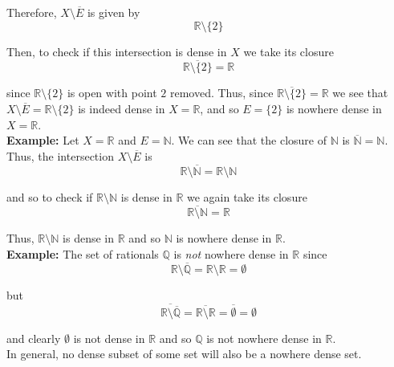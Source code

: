 \documentclass[12pt]{article}
\newcommand{\R}{\mathbb R}
\newcommand{\N}{\mathbb N}
\newcommand{\Q}{\mathbb Q}
\begin{document}
Therefore, $X\setminus\overline{E}$ is given by
\begin{equation*}
	\R\setminus\{2\}
\end{equation*}

Then, to check if this intersection is dense in $X$ we take its closure
\begin{equation*}
	\overline{\R\setminus\{2\}} = \R
\end{equation*}

since $\R\setminus\{2\}$ is open with point $2$ removed. Thus, since $\overline{\R\setminus\{2\}} = \R$ we see that $X \setminus \overline{E} = \R\setminus\{2\}$ is indeed dense in $X = \R$, and so $E = \{2\}$ is nowhere dense in $X = \R$. \\

%
%
{\bf Example:} Let $X = \R$ and $E = \N$. We can see that the closure of $\N$ is $\overline{\N} = \N$. Thus, the intersection $X \setminus \overline{E}$ is
\begin{equation*}
	\R\setminus{\overline{\N}} = \R\setminus\N 
\end{equation*}

and so to check if $\R\setminus\N$ is dense in $\R$ we again take its closure
\begin{equation*}
	\overline{\R\setminus\N} = \R
\end{equation*}

Thus, $\R\setminus\N$ is dense in $\R$ and so $\N$ is nowhere dense in $\R$. \\

%
%
{\bf Example:} The set of rationals $\Q$ is {\em not} nowhere dense in $\R$ since
\begin{equation*}
	\R\setminus{\overline{\Q}} = \R\setminus\R = \emptyset
\end{equation*}

but
\begin{equation*}
	\overline{\R\setminus\overline{\Q}} = \overline{\R\setminus\R} = \overline{\emptyset} = \emptyset
\end{equation*}

and clearly $\emptyset$ is not dense in $\R$ and so $\Q$ is not nowhere dense in $\R$. \\

In general, no dense subset of some set will also be a nowhere dense set. \\
\end{document}
